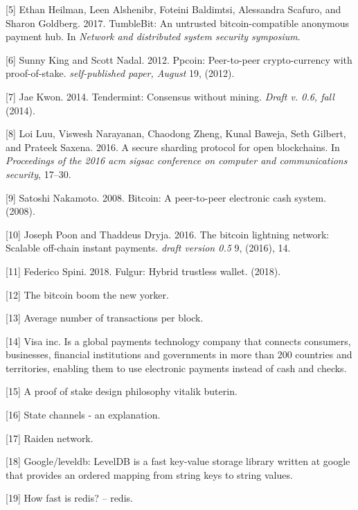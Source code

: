 \documentclass[12pt,italian,]{book}
\begin{document}
\leavevmode\hypertarget{ref-heilman2017tumblebit}{}%
{[}5{]} Ethan Heilman, Leen Alshenibr, Foteini Baldimtsi, Alessandra Scafuro, and Sharon Goldberg. 2017. TumbleBit: An untrusted bitcoin-compatible anonymous payment hub. In \emph{Network and distributed system security symposium}.

\leavevmode\hypertarget{ref-king2012ppcoin}{}%
{[}6{]} Sunny King and Scott Nadal. 2012. Ppcoin: Peer-to-peer crypto-currency with proof-of-stake. \emph{self-published paper, August} 19, (2012).

\leavevmode\hypertarget{ref-kwon2014tendermint}{}%
{[}7{]} Jae Kwon. 2014. Tendermint: Consensus without mining. \emph{Draft v. 0.6, fall} (2014).

\leavevmode\hypertarget{ref-luu2016secure}{}%
{[}8{]} Loi Luu, Viswesh Narayanan, Chaodong Zheng, Kunal Baweja, Seth Gilbert, and Prateek Saxena. 2016. A secure sharding protocol for open blockchains. In \emph{Proceedings of the 2016 acm sigsac conference on computer and communications security}, 17--30.

\leavevmode\hypertarget{ref-nakamoto2008bitcoin}{}%
{[}9{]} Satoshi Nakamoto. 2008. Bitcoin: A peer-to-peer electronic cash system. (2008).

\leavevmode\hypertarget{ref-poon2016bitcoin}{}%
{[}10{]} Joseph Poon and Thaddeus Dryja. 2016. The bitcoin lightning network: Scalable off-chain instant payments. \emph{draft version 0.5} 9, (2016), 14.

\leavevmode\hypertarget{ref-federicospini2018}{}%
{[}11{]} Federico Spini. 2018. Fulgur: Hybrid trustless wallet. (2018).

\leavevmode\hypertarget{ref-TheBitco9}{}%
{[}12{]} The bitcoin boom \textbar{} the new yorker.

\leavevmode\hypertarget{ref-BlockchainStats}{}%
{[}13{]} Average number of transactions per block.

\leavevmode\hypertarget{ref-VISA}{}%
{[}14{]} Visa inc. Is a global payments technology company that connects consumers, businesses, financial institutions and governments in more than 200 countries and territories, enabling them to use electronic payments instead of cash and checks.

\leavevmode\hypertarget{ref-AProofof65}{}%
{[}15{]} A proof of stake design philosophy \textbar{} vitalik buterin.

\leavevmode\hypertarget{ref-StateCha71}{}%
{[}16{]} State channels - an explanation.

\leavevmode\hypertarget{ref-raiden}{}%
{[}17{]} Raiden network.

\leavevmode\hypertarget{ref-googlele43}{}%
{[}18{]} Google/leveldb: LevelDB is a fast key-value storage library written at google that provides an ordered mapping from string keys to string values.

\leavevmode\hypertarget{ref-Howfasti99}{}%
{[}19{]} How fast is redis? -- redis.
\end{document}
